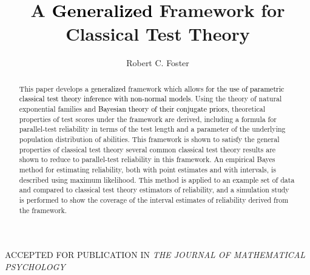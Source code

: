 \documentclass[12pt,epsfig]{article}
\newcommand{\change}[1]{\textcolor{black}{#1}}
\newcommand{\changed}[1]{\textcolor{black}{#1}}
\begin{document}


\title{A \change{Generalized} Framework for Classical Test Theory}
\author{Robert C. Foster}
\date{}


\maketitle

\begin{centering}
ACCEPTED FOR PUBLICATION IN \emph{THE JOURNAL OF MATHEMATICAL PSYCHOLOGY}\\
\end{centering}

\begin{abstract}


This paper develops a \changed{generalized} framework which allows \change{for the use of parametric classical test theory inference with non-normal models}. Using the theory of natural exponential families and \changed{Bayesian theory of their conjugate priors,} theoretical properties of test scores under the framework are derived, including a formula for parallel-test reliability in terms of the test length and a parameter of the underlying population distribution of abilities. This framework is shown to satisfy the general properties of classical test theory several common classical test theory results are shown to reduce to parallel-test reliability in this framework. An empirical Bayes method for estimating reliability, both with point estimates and with intervals, is described using maximum likelihood. This method is applied to an example set of data and compared to classical test theory estimators of reliability, and a simulation study is performed to show the coverage of the interval estimates of reliability derived from the framework.

\end{abstract}
\end{document}
